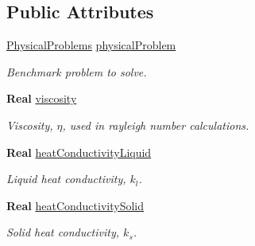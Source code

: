 \subsection*{Public Attributes}
\begin{DoxyCompactItemize}
\item 
\mbox{\label{class_mushy_layer_params_af648dea6d76d52f10124c33f6817be2b}} 
\hyperlink{_mushy_layer_params_8h_a9d2eece4e74f7ad0ebcd5759116a94a4}{Physical\+Problems} \hyperlink{class_mushy_layer_params_af648dea6d76d52f10124c33f6817be2b}{physical\+Problem}
\begin{DoxyCompactList}\small\item\em Benchmark problem to solve. \end{DoxyCompactList}\item 
\mbox{\label{class_mushy_layer_params_a0458bb90fd4db3977b2af0a0aa369386}} 
\textbf{ Real} \hyperlink{class_mushy_layer_params_a0458bb90fd4db3977b2af0a0aa369386}{viscosity}
\begin{DoxyCompactList}\small\item\em Viscosity, $ \eta $, used in rayleigh number calculations. \end{DoxyCompactList}\item 
\mbox{\label{class_mushy_layer_params_ac5dcaee57b4ea4ea4fc1c26d578f2e48}} 
\textbf{ Real} \hyperlink{class_mushy_layer_params_ac5dcaee57b4ea4ea4fc1c26d578f2e48}{heat\+Conductivity\+Liquid}
\begin{DoxyCompactList}\small\item\em Liquid heat conductivity, $ k_l $. \end{DoxyCompactList}\item 
\mbox{\label{class_mushy_layer_params_a57cd61cc35cfd06330a3cb6e67c1bddc}} 
\textbf{ Real} \hyperlink{class_mushy_layer_params_a57cd61cc35cfd06330a3cb6e67c1bddc}{heat\+Conductivity\+Solid}
\begin{DoxyCompactList}\small\item\em Solid heat conductivity, $ k_s $. \end{DoxyCompactList}\item 
\mbox{\label{class_mushy_layer_params_ab80de1952111d2c7bd8eeb30c4388441}} 

\end{DoxyCompactItemize}
